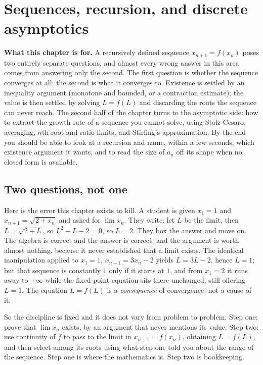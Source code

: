 \chapter{Sequences, recursion, and discrete asymptotics}

\begin{orient}
\textbf{What this chapter is for.} A recursively defined sequence $x_{n+1}=f(x_n)$ poses two entirely separate questions, and almost every wrong answer in this area comes from answering only the second. The first question is whether the sequence converges at all; the second is what it converges to. Existence is settled by an inequality argument (monotone and bounded, or a contraction estimate); the value is then settled by solving $L=f(L)$ and discarding the roots the sequence can never reach. The second half of the chapter turns to the asymptotic side: how to extract the growth rate of a sequence you cannot solve, using Stolz-Cesaro, averaging, $n$th-root and ratio limits, and Stirling's approximation. By the end you should be able to look at a recursion and name, within a few seconds, which existence argument it wants, and to read the size of $a_n$ off its shape when no closed form is available.
\end{orient}

\section{Two questions, not one}

Here is the error this chapter exists to kill. A student is given $x_1=1$ and $x_{n+1}=\sqrt{2+x_n}$ and asked for $\lim x_n$. They write: let $L$ be the limit, then $L=\sqrt{2+L}$, so $L^2-L-2=0$, so $L=2$. They box the answer and move on. The algebra is correct and the answer is correct, and the argument is worth almost nothing, because it never established that a limit exists. The identical manipulation applied to $x_1=1$, $x_{n+1}=3x_n-2$ yields $L=3L-2$, hence $L=1$; but that sequence is constantly $1$ only if it starts at $1$, and from $x_1=2$ it runs away to $+\infty$ while the fixed-point equation sits there unchanged, still offering $L=1$. The equation $L=f(L)$ is a \emph{consequence} of convergence, not a cause of it.

So the discipline is fixed and it does not vary from problem to problem. Step one: prove that $\lim x_n$ exists, by an argument that never mentions its value. Step two: use continuity of $f$ to pass to the limit in $x_{n+1}=f(x_n)$, obtaining $L=f(L)$, and then select among its roots using what step one told you about the range of the sequence. Step one is where the mathematics is. Step two is bookkeeping.

